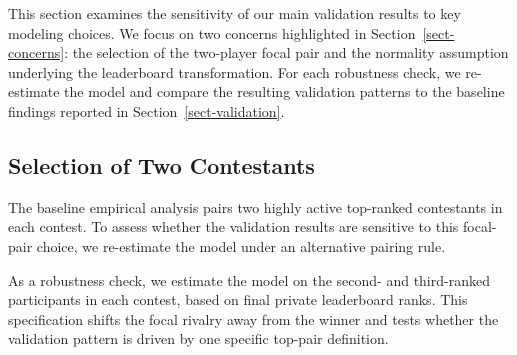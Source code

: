 \documentclass[mnsc]{informs3}
\begin{document}
This section examines the sensitivity of our main validation results to key modeling choices.
We focus on two concerns highlighted in Section~\ref{sect-concerns}: the selection of the two-player focal pair and the normality assumption underlying the leaderboard transformation. For each robustness check, we re-estimate the model and compare the resulting validation patterns to the baseline findings reported in Section~\ref{sect-validation}.

\subsection{Selection of Two Contestants}\label{sect-robust-2players}

The baseline empirical analysis pairs two highly active top-ranked contestants in each contest.
To assess whether the validation results are sensitive to this focal-pair choice, we re-estimate the model under an alternative pairing rule.

As a robustness check, we estimate the model on the second- and third-ranked participants in each contest, based on final private leaderboard ranks.
This specification shifts the focal rivalry away from the winner and tests whether the validation pattern is driven by one specific top-pair definition.
\end{document}
